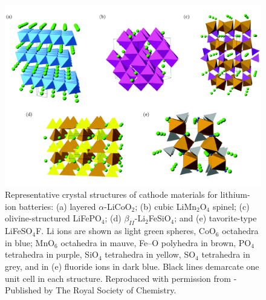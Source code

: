 \documentclass[../main.tex]{subfiles}
\begin{document}
\begin{figure}
    \centering
    \includegraphics[scale=0.5]{figures/cathode_structures.pdf}
    \caption{Representative crystal structures of cathode materials for lithium-ion batteries: (a) layered $\alpha$-LiCoO$_2$; (b) cubic LiMn$_2$O$_4$ spinel; (c) olivine-structured LiFePO$_4$; (d) $\beta_{II}$-Li$_2$FeSiO$_4$; and (e) tavorite-type LiFeSO$_4$F. Li ions are shown as light green spheres, CoO$_6$ octahedra in blue; MnO$_6$ octahedra in mauve, Fe–O polyhedra in brown, PO$_4$ tetrahedra in purple, SiO$_4$ tetrahedra in yellow, SO$_4$ tetrahedra in grey, and in (e) fluoride ions in dark blue. Black lines demarcate one unit cell in each structure. Reproduced with permission from \citeauthor{islam2014lithium} \cite{islam2014lithium} - Published by The Royal Society of Chemistry.}
    \label{fig:cathode_structures}
\end{figure}
\end{document}
